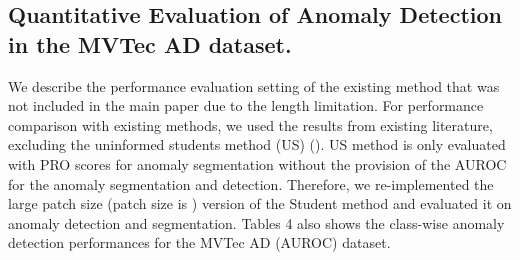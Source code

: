 \documentclass{article} \usepackage{iclr2022_conference,times}
\begin{document}
\subsection{Quantitative Evaluation of Anomaly Detection in the MVTec AD dataset.}

We describe the performance evaluation setting of the existing method that was not included in the main paper due to the length limitation. For performance comparison with existing methods, we used the results from existing literature, excluding the uninformed students method (US) (\cite{stu}). US method is only evaluated with PRO scores for anomaly segmentation without the provision of the AUROC for the anomaly segmentation and detection. Therefore, we re-implemented the large patch size (patch size is ) version of the Student method and evaluated it on anomaly detection and segmentation. Tables 4 also shows the class-wise anomaly detection performances for the MVTec AD (AUROC) dataset.
\end{document}
